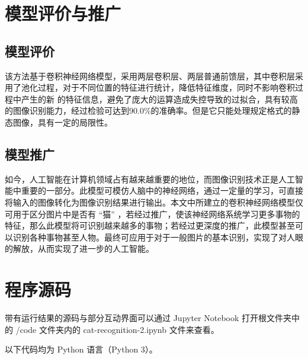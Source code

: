 \documentclass[UTF8]{ctexart}
\begin{document}
\section{模型评价与推广}
\subsection{模型评价}
该方法基于卷积神经网络模型，采用两层卷积层、两层普通前馈层，其中卷积层采用了池化过程，对于不同位置的特征进行统计，降低特征维度，同时不影响卷积过程中产生的新
的特征信息，避免了庞大的运算造成失控导致的过拟合，具有较高的图像识别能力，经过检验可达到90.0\%的准确率。但是它只能处理规定格式的静态图像，具有一定的局限性。

\subsection{模型推广}
如今，人工智能在计算机领域占有越来越重要的地位，而图像识别技术正是人工智能中重要的一部分。此模型可模仿人脑中的神经网络，通过一定量的学习，可直接将输入的图像转化为图像识别结果进行输出。本文中所建立的卷积神经网络模型仅可用于区分图片中是否有 “猫” ，若经过推广，使该神经网络系统学习更多事物的特征，那么此模型将可识别越来越多的事物；若经过更深度的推广，此模型甚至可以识别各种事物甚至人物。最终可应用于对于一般图片的基本识别，实现了对人眼的解放，从而实现了进一步的人工智能。


\clearpage
\appendix
\appendixname
\section{程序源码}
带有运行结果的源码与部分互动界面可以通过 Jupyter Notebook 打开根文件夹中的 /code 文件夹内的 cat-recognition-2.ipynb 文件来查看。

以下代码均为 Python 语言（Python 3）。
\end{document}
